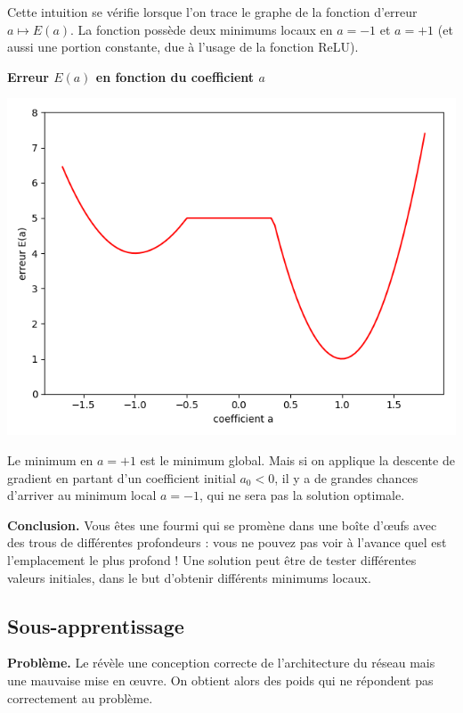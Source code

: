 Cette intuition se vérifie lorsque l'on trace le graphe de la fonction d'erreur $a \mapsto E(a)$. La fonction possède deux minimums locaux en $a=-1$ et $a=+1$ (et aussi une portion constante, due à l'usage de la fonction ReLU).
\begin{center}
	\textbf{Erreur $E(a)$ en fonction du coefficient $a$}
	
	\includegraphics[scale=\myscale,scale=0.45]{figures/retro_04_e}
\end{center}
Le minimum en $a=+1$ est le minimum global. Mais si on applique la descente de gradient en partant d'un coefficient initial $a_0<0$, il y a de grandes chances d'arriver au minimum local $a=-1$, qui ne sera pas la solution optimale.

\bigskip

\textbf{Conclusion.} Vous êtes une fourmi qui se promène dans une boîte d'\oe ufs avec des trous de différentes profondeurs : vous ne pouvez pas voir à l'avance quel est l'emplacement le plus profond ! Une solution peut être de tester différentes valeurs initiales, dans le but d'obtenir différents minimums locaux.

\subsection{Sous-apprentissage}

\textbf{Problème.}
Le  révèle une conception correcte de l'architecture du réseau mais une mauvaise mise en \oe uvre. On obtient alors des poids qui ne répondent pas correctement au problème.

